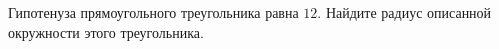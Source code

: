 \begin{ex}
	\begin{condition}
		Гипотенуза прямоугольного треугольника равна \( 12 \). Найдите радиус описанной окружности этого треугольника.
	\end{condition}
\end{ex}